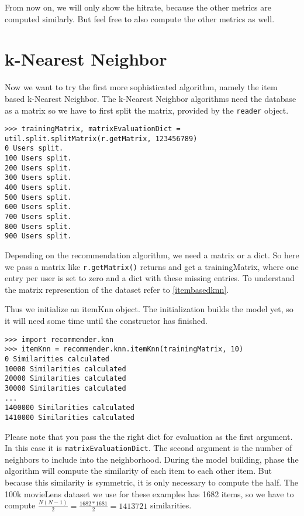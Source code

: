 From now on, we will only show the hitrate, because the other metrics are computed
similarly. But feel free to also compute the other metrics as well.

\section{k-Nearest Neighbor}
Now we want to try the first more sophisticated algorithm, namely the item based
k-Nearest Neighbor. The k-Nearest Neighbor algorithms need the database as a matrix so we have to
first split the matrix, provided by the \lstinline!reader! object.
\begin{lstlisting}[style=python]
>>> trainingMatrix, matrixEvaluationDict = util.split.splitMatrix(r.getMatrix, 123456789)
0 Users split.
100 Users split.
200 Users split.
300 Users split.
400 Users split.
500 Users split.
600 Users split.
700 Users split.
800 Users split.
900 Users split.
\end{lstlisting}
Depending on the recommendation algorithm, we need a matrix or a dict.
So here we pass a matrix like \lstinline!r.getMatrix()! returns and get a trainingMatrix, where one
entry per user is set to zero and a dict with these missing entries.
To understand the matrix represention of the dataset refer to \ref{itembasedknn}.

Thus we initialize an itemKnn object. The initialization builds the model yet,
so it will need some time until the constructor has finished.
\begin{lstlisting}[style=python]
>>> import recommender.knn
>>> itemKnn = recommender.knn.itemKnn(trainingMatrix, 10)
0 Similarities calculated
10000 Similarities calculated
20000 Similarities calculated
30000 Similarities calculated
...
1400000 Similarities calculated
1410000 Similarities calculated
\end{lstlisting}
Please note that you pass the the right dict for evaluation as the first argument. 
In this case it is \lstinline!matrixEvaluationDict!.
The second argument is the number of neighbors to include into the neighborhood.
During the model building, phase the algorithm will compute the similarity of each
item to each other item. But because this similarity is symmetric, it is only
necessary to compute the half. The 100k movieLens dataset we use for these examples
has 1682 items, so we have to compute \begin{math} \frac{N(N-1)}{2}=\frac{1682*1681}{2} = 1413721 \end{math} 
similarities.

